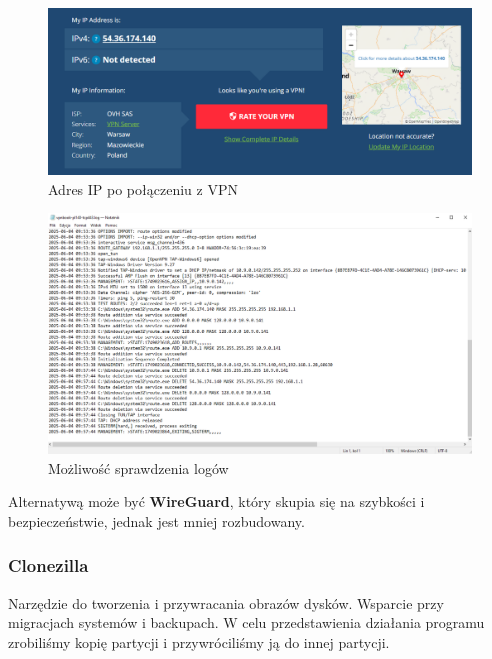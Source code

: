 \documentclass[0.82pt,a4paper]{article}
\begin{document}
    \begin{figure}[H]
        \centering
        \includegraphics[width=0.8\linewidth]{media/OpenVPN/3_zmiana_adresu_IP.PNG}
        \caption[]{Adres IP po połączeniu z VPN}
        \label{fig:vpn_ip_po_vpn}
    \end{figure}
        
    \begin{figure}[H]
        \centering
        \includegraphics[width=0.8\linewidth]{media/OpenVPN/4_logi.PNG}
        \caption[]{Możliwość sprawdzenia logów}
        \label{fig:vpn_logi}
    \end{figure}
    
    Alternatywą może być \textbf{WireGuard}, który skupia się na szybkości i bezpieczeństwie, jednak jest mniej rozbudowany.
\newpage   
\subsubsection{Clonezilla}
    Narzędzie do tworzenia i przywracania obrazów dysków. Wsparcie przy migracjach systemów i backupach. W celu przedstawienia działania programu zrobiliśmy kopię partycji i przywróciliśmy ją do innej partycji.
\end{document}
